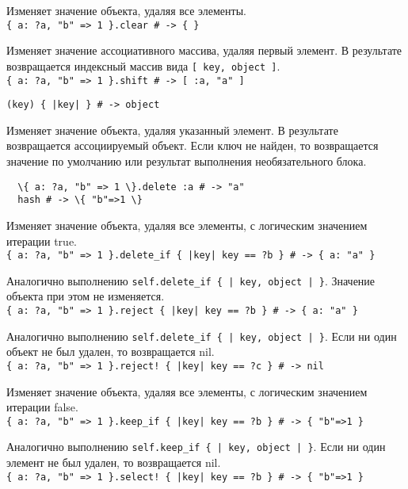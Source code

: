 \begin{methodlist}
  Изменяет значение объекта, удаляя все элементы. 
  \\\verb!{ a: ?a, "b" => 1 }.clear # -> { }!
 
  Изменяет значение ассоциативного массива, удаляя первый элемент. В результате возвращается индексный массив вида \verb![ key, object ]!. 
  \\\verb!{ a: ?a, "b" => 1 }.shift # -> [ :a, "a" ]!
 
  \verb!(key) { |key| } # -> object!

  Изменяет значение объекта, удаляя указанный элемент. В результате возвращается ассоциируемый объект. Если ключ не найден, то возвращается значение по умолчанию или результат выполнения необязательного блока. 
  \begin{verbatim}
  \{ a: ?a, "b" => 1 \}.delete :a # -> "a"
  hash # -> \{ "b"=>1 \}
  \end{verbatim}
 
  Изменяет значение объекта, удаляя все элементы, с логическим значением итерации true. 
  \\\verb!{ a: ?a, "b" => 1 }.delete_if { |key| key == ?b } # -> { a: "a" }!
 
  Аналогично выполнению \verb!self.delete_if { | key, object | }!. Значение объекта при этом не изменяется. 
  \\\verb!{ a: ?a, "b" => 1 }.reject { |key| key == ?b } # -> { a: "a" }!

  Аналогично выполнению \verb!self.delete_if { | key, object | }!. Если ни один объект не был удален, то возвращается nil. 
  \\\verb/{ a: ?a, "b" => 1 }.reject! { |key| key == ?c } # -> nil/
 
  Изменяет значение объекта, удаляя все элементы, с логическим значением итерации false. 
  \\\verb!{ a: ?a, "b" => 1 }.keep_if { |key| key == ?b } # -> { "b"=>1 }!
 
  Аналогично выполнению \verb!self.keep_if { | key, object | }!. Если ни один элемент не был удален, то возвращается nil. 
  \\\verb/{ a: ?a, "b" => 1 }.select! { |key| key == ?b } # -> { "b"=>1 }/
\end{methodlist}

